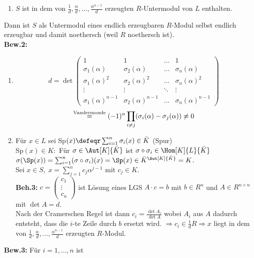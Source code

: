 \begin{Bew}
\begin{enumerate}
  \item $S$ ist in dem von $\frac{1}{d}, \frac{\alpha}{d}, \dots,
  \frac{\alpha^{n-1}}{d}$ erzeugten $R$-Untermodul von $L$ enthalten.
\end{enumerate}
Dann ist $S$ als Untermodul eines endlich erzeugbaren $R$-Modul selbst endlich
erzeugbar und damit noethersch (weil $R$ noethersch ist).\\
\textbf{Bew.2:}
\begin{enumerate}
  \item
  \[
  d = \det
  \begin{pmatrix}
  1 & 1 & \dots & 1 \\
  \sigma_1(\alpha) & \sigma_2(\alpha) & \dots & \sigma_n(\alpha) \\
  \sigma_1(\alpha)^2 & \sigma_2(\alpha)^2 & \dots & \sigma_n(\alpha)^2 \\
  \vdots & \vdots & \ddots & \vdots \\
  \sigma_1(\alpha)^{n-1} & \sigma_2(\alpha)^{n-1} & \dots & \sigma_n(\alpha)^{n-1}
  \end{pmatrix}
\]
\[
  \overset{\text{\scriptsize Vandermonde}}{=}(-1)^n \prod_{i \not= j}
  (\sigma_i(\alpha) - \sigma_j(\alpha)) \not= 0
\]
  \item Für $x \in L$ sei Sp$(x) \defeqr \sum_{i=1}^n \sigma_i(x) \in \bar{K}$
  (\glqq Spur\grqq)\\
  Sp$(x) \in K:$ Für $\sigma \in \Aut[K]{\bar{K}}$ ist $\sigma \circ \sigma_i \in
  \Hom[K]{L}{\bar{K}}$\\
  $\sigma(\Sp(x)) = \sum_{i=1}^n (\sigma \circ \sigma_i)(x) = \Sp(x)
  \in \bar{K}^{\Aut[K]{\bar{K}}} = K$.\\
  Sei $x \in S, \; x = \sum_{j=1}^n c_j \alpha^{j-1}$ mit $c_j \in K$.\\
  \textbf{Beh.3:} $c = \begin{pmatrix} c_1\\ \vdots\\ c_n \end{pmatrix}$ ist
  Lösung eines LGS $A \cdot c = b$ mit $b \in R^n$ und $A \in R^{n \times n}$
  mit $\det A = d$.\\
  Nach der Cramerschen Regel ist dann $c_i = \frac{\det A_i}{\det A}$ wobei
  $A_i$ aus $A$ dadurch entsteht, dass die $i$-te Zeile durch $b$ ersetzt wird.
  $\Rightarrow c_i \in \frac{1}{d}R \Rightarrow x$ liegt in dem von $\frac{1}{d}, \frac{\alpha}{d}, \dots,
  \frac{\alpha^{n-1}}{d}$ erzeugten $R$-Modul.
\end{enumerate}
\textbf{Bew.3:} Für $i=1, \dots, n$ ist

\end{Bew}
